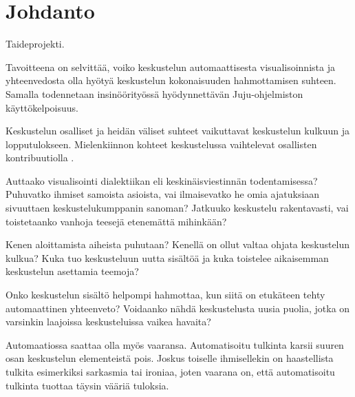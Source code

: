 \documentclass[11pt,a4paper,oneside]{memoir}
\begin{document}
\pagestyle{empty} %
\tableofcontents*
\pagestyle{empty} %
\clearpage
\pagestyle{plain}




\setcounter{page}{1} %


\chapter{Johdanto}
Taideprojekti.

Tavoitteena on selvittää, voiko keskustelun automaattisesta visualisoinnista ja yhteenvedosta olla hyötyä keskustelun kokonaisuuden hahmottamisen suhteen. Samalla todennetaan insinöörityössä hyödynnettävän Juju-ohjelmiston käyttökelpoisuus.

Keskustelun osalliset ja heidän väliset suhteet vaikuttavat keskustelun kulkuun ja lopputulokseen. Mielenkiinnon kohteet keskustelussa vaihtelevat osallisten kontribuutiolla \cite[s. 1]{finding-topics-in-dynamical-text}. 

Auttaako visualisointi dialektiikan eli keskinäisviestinnän todentamisessa? Puhuvatko ihmiset samoista asioista, vai ilmaisevatko he omia ajatuksiaan sivuuttaen keskustelukumppanin sanoman? Jatkuuko keskustelu rakentavasti, vai toistetaanko vanhoja teesejä etenemättä mihinkään?

Kenen aloittamista aiheista puhutaan? Kenellä on ollut valtaa ohjata keskustelun kulkua? Kuka tuo keskusteluun uutta sisältöä ja kuka toistelee aikaisemman keskustelun asettamia teemoja?

Onko keskustelun sisältö helpompi hahmottaa, kun siitä on etukäteen tehty automaattinen yhteenveto? Voidaanko nähdä keskustelusta uusia puolia, jotka on varsinkin laajoissa keskusteluissa vaikea havaita?

Automaatiossa saattaa olla myös vaaransa. Automatisoitu tulkinta karsii suuren osan keskustelun elementeistä pois. Joskus toiselle ihmisellekin on haastellista tulkita esimerkiksi sarkasmia tai ironiaa, joten vaarana on, että automatisoitu tulkinta tuottaa täysin vääriä tuloksia.
\end{document}
